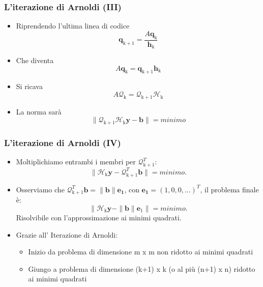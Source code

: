 \documentclass[10pt]{beamer}
\begin{document}
\begin{frame} \frametitle{L'iterazione di Arnoldi (III)}
\begin{itemize}
\item Riprendendo l'ultima linea di codice $$\mathbf{q}_{\mathrm{k}+1} =\frac{ A \mathbf{q}_{\mathrm{k}}}{\mathbf{h}_{\mathrm{k}}}$$
\item Che diventa $$  A\mathbf{q}_\mathrm{k}  = \mathbf{q}_{\mathrm{k}+1}\mathbf{h}_\mathrm{k} $$
\item Si ricava $$   A\mathcal{Q}_\mathrm{k}  = \mathcal{Q}_{\mathrm{k}+1}\mathcal{H}_\mathrm{k} $$
\item La norma sarà$$\|\mathcal{Q}_{\mathrm{k}+1}\mathcal{H}_\mathrm{k}\mathbf{y}-\mathbf{b}\| = minimo$$
\end{itemize}
\end{frame}


\begin{frame} \frametitle{L'iterazione di Arnoldi (IV)}
\begin{itemize}
    \item Moltiplichiamo entrambi i membri per $\mathcal{Q}^T_{\mathrm{k}+1}$: $$\|\mathcal{H}_\mathrm{k}\mathbf{y}-\mathcal{Q}^T_{\mathrm{k}+1}\mathbf{b}\| = minimo.$$
    \item Osserviamo che $\mathcal{Q}^T_{\mathrm{k}+1}\mathbf{b}=\|\mathbf{b}\|\mathbf{e_1}$, con $\mathbf{e_1}=(1,0,0,\dots)^T$, il problema 
    finale è:$$\|\mathcal{H}_\mathrm{k}\mathbf{y}-\|\mathbf{b}\|\mathbf{e}_1\| = minimo.$$ Risolvibile con l'approssimazione ai minimi quadrati. 
\item Grazie all' \alert{Iterazione di Arnoldi}:\begin{itemize}
\item Inizio da problema di dimensione m x m non ridotto ai minimi quadrati
\item Giungo a problema di dimensione (k+1) x k (o al più (n+1) x n) ridotto ai minimi quadrati \end{itemize}
\end{itemize}
\end{frame}



\end{document}
